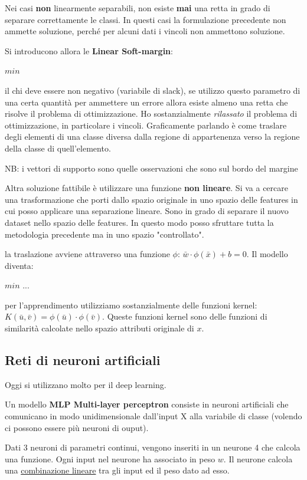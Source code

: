 \documentclass[12pt, a4paper,titlepage,openany]{article}
\begin{document}
Nei casi \textbf{non} linearmente separabili, non esiste \textbf{mai} una retta in grado di separare correttamente le classi. In questi casi la formulazione precedente non ammette soluzione, perch\'e per alcuni dati i vincoli non ammettono soluzione. 

Si introducono allora le \textbf{Linear Soft-margin}:

$min $

il chi deve essere non negativo (variabile di slack), se utilizzo questo parametro di una certa quantit\`a per ammettere un errore allora esiste almeno una retta che risolve il problema di ottimizzazione. Ho sostanzialmente \textit{rilassato} il problema di ottimizzazione, in particolare i vincoli. Graficamente parlando \`e come traslare degli elementi di una classe diversa dalla regione di appartenenza verso la regione della classe di quell'elemento.

NB: i vettori di supporto sono quelle osservazioni che sono sul bordo del margine

Altra soluzione fattibile \`e utilizzare una funzione \textbf{non lineare}. Si va a cercare una trasformazione che porti dallo spazio originale in uno spazio delle features in cui posso applicare una separazione lineare. Sono in grado di separare il nuovo dataset nello spazio delle features. In questo modo posso sfruttare tutta la metodologia precedente ma in uno spazio "controllato". 

la traslazione avviene attraverso una funzione $\phi$: $\bar{w} \cdot \phi(\bar{x}) + b = 0$. Il modello diventa:

$ min $ ...

per l'apprendimento utilizziamo sostanzialmente delle funzioni kernel: $K(\bar{u}, \bar{v}) = \phi(\bar{u}) \cdot \phi(\bar{v})$. Queste funzioni kernel sono delle funzioni di similarit\`a calcolate nello spazio attributi originale di $x$.

\subsection{Reti di neuroni artificiali}
Oggi si utilizzano molto per il deep learning.

Un modello \textbf{MLP Multi-layer perceptron} consiste in neuroni artificiali che comunicano in modo unidimensionale dall'input X alla variabile di classe (volendo ci possono essere pi\`u neuroni di ouput).

Dati 3 neuroni di parametri continui, vengono inseriti in un neurone 4 che calcola una funzione. Ogni input nel neurone ha associato in peso $w$.
Il neurone calcola una \underline{combinazione lineare} tra gli input ed il peso dato ad esso. 
\end{document}

